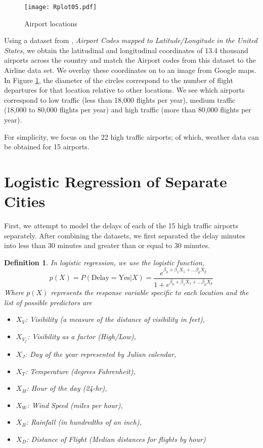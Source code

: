 \documentclass{asaproc}
\newtheorem{defn}{Definition}
\begin{document}
\begin{figure}[h]
    \texttt{[image: Rplot05.pdf]}
    \caption{Airport locations}
    \label{fig:loc}
\end{figure}

Using a dataset from  \cite{SO}, \textit{Airport Codes mapped to Latitude/Longitude in the United States}, we obtain the latitudinal and longitudinal coordinates of 13.4 thousand airports across the country and match the Airport codes from this dataset to the Airline data set. We overlay these coordinates on to an image from Google maps. In Figure \ref{fig:loc}, the diameter of the circles correspond to the number of flight departures for that location relative to other locations. We see which airports correspond to low traffic (less than 18,000 flights per year), medium traffic (18,000 to 80,000 flights per year) and high traffic (more than 80,000 flights per year).

For simplicity, we focus on the 22 high traffic airports; of which, weather data can be obtained for 15 airports.

\section{Logistic Regression of Separate Cities}

First, we attempt to model the delays of each of the 15 high traffic airports separately. After combining the datasets, we first separated the delay minutes into less than 30 minutes and greater than or equal to 30 minutes.

\begin{defn}\label{Def1}
In logistic regression, we use the logistic function,
$$p(X) = P(\text{Delay} = \text{Yes}|X) = \frac{e^{\beta_0 + \beta_1 X_1 +... \beta_p X_p}}{1 + e^{\beta_0 + \beta_1 X_1 +... \beta_p X_p}}$$
Where $p(X)$ represents the response variable specific to each location and the list of possible predictors are
\begin{itemize}
    \item $X_V$: Visibility (a measure of the distance of visibility in feet),
    \item $X_{V_f}$: Visibility as a factor (High/Low),
    \item $X_J$: Day of the year represented by Julian calendar,
    \item $X_T$: Temperature (degrees Fahrenheit), 
    \item $X_H$: Hour of the day (24-hr),
    \item $X_W$: Wind Speed (miles per hour),
    \item $X_R$: Rainfall (in hundredths of an inch),
    \item $X_D$: Distance of Flight (Median distances for flights by hour)
\end{itemize}
\end{defn}
\end{document}
